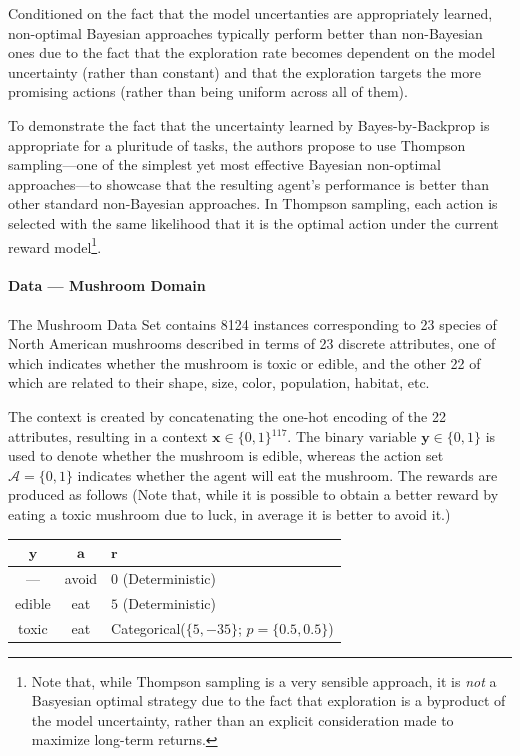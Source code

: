 \documentclass[11pt]{article}
\begin{document}
Conditioned on the fact that the model uncertanties are appropriately learned,
non-optimal Bayesian approaches typically perform better than non-Bayesian ones
due to the fact that the exploration rate becomes dependent on the model
uncertainty (rather than constant) and that the exploration targets the more
promising actions (rather than being uniform across all of them).

To demonstrate the fact that the uncertainty learned by Bayes-by-Backprop is
appropriate for a pluritude of tasks, the authors propose to use Thompson
sampling---one of the simplest yet most effective Bayesian non-optimal
approaches---to showcase that the resulting agent's performance is better than
other standard non-Bayesian approaches.  In Thompson sampling, each action is
selected with the same likelihood that it is the optimal action under the
current reward model\footnote{Note that, while Thompson sampling is a very
sensible approach, it is \emph{not} a Basyesian optimal strategy due to the
fact that exploration is a byproduct of the model uncertainty, rather than an
explicit consideration made to maximize long-term returns.}.  


\paragraph{Data --- Mushroom Domain} The Mushroom Data Set\cite{mushroom}
contains 8124 instances corresponding to 23 species of North American mushrooms
described in terms of 23 discrete attributes, one of which indicates whether
the mushroom is toxic or edible, and the other 22 of which are related to their
shape, size, color, population, habitat, etc.

The context is created by concatenating the one-hot encoding of the 22
attributes, resulting in a context $\bm x\in \{0, 1\}{}^{117}$.  The binary
variable $\bm y\in\{0, 1\}$ is used to denote whether the mushroom is edible,
whereas the action set $\mathcal{A} = \{0, 1\}$ indicates whether the agent
will eat the mushroom.  The rewards are produced as follows (Note that, while
it is possible to obtain a better reward by eating a toxic mushroom due to
luck, in average it is better to avoid it.)

\begin{center}
\begin{tabular}{ccl}
  $\bm y$ & $\bm a$ & $\bm r$ \\ 
  \toprule
  --- & avoid & $0$ (Deterministic) \\
  edible & eat & $5$ (Deterministic) \\
  toxic & eat & Categorical\@($\{5, -35\}$; $p=\{0.5, 0.5\}$) \\  
\end{tabular}
\end{center}
\end{document}
